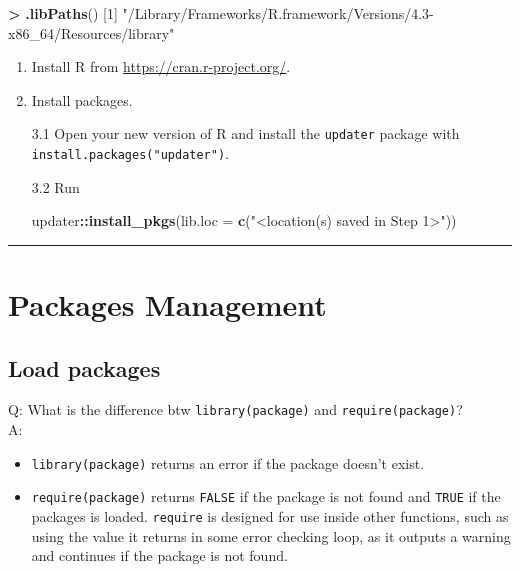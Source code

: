 \documentclass[
  a4paper,
  twoside,
  openright]{book}
\newenvironment{Shaded}{\begin{snugshade}}{\end{snugshade}}
\newcommand{\AttributeTok}[1]{\textcolor[rgb]{0.13,0.29,0.53}{#1}}
\newcommand{\DecValTok}[1]{\textcolor[rgb]{0.00,0.00,0.81}{#1}}
\newcommand{\FunctionTok}[1]{\textcolor[rgb]{0.13,0.29,0.53}{\textbf{#1}}}
\newcommand{\NormalTok}[1]{#1}
\newcommand{\SpecialCharTok}[1]{\textcolor[rgb]{0.81,0.36,0.00}{\textbf{#1}}}
\newcommand{\StringTok}[1]{\textcolor[rgb]{0.31,0.60,0.02}{#1}}
\theoremstyle{definition}
\theoremstyle{definition}
\theoremstyle{definition}
\theoremstyle{definition}
\theoremstyle{remark}
\begin{document}
\begin{Shaded}
\begin{Highlighting}[]
\SpecialCharTok{\textgreater{}} \FunctionTok{.libPaths}\NormalTok{()}
\NormalTok{[}\DecValTok{1}\NormalTok{] }\StringTok{"/Library/Frameworks/R.framework/Versions/4.3{-}x86\_64/Resources/library"}
\end{Highlighting}
\end{Shaded}

\begin{enumerate}
\def\labelenumi{\arabic{enumi}.}
\setcounter{enumi}{1}
\item
  Install R from \url{https://cran.r-project.org/}.
\item
  Install packages.

  3.1 Open your new version of R and install the \texttt{updater} package with \texttt{install.packages("updater")}.

  3.2 Run

\begin{Shaded}
\begin{Highlighting}[]
\NormalTok{updater}\SpecialCharTok{::}\FunctionTok{install\_pkgs}\NormalTok{(}\AttributeTok{lib.loc =} \FunctionTok{c}\NormalTok{(}\StringTok{"\textless{}location(s) saved in Step 1\textgreater{}"}\NormalTok{))}
\end{Highlighting}
\end{Shaded}
\end{enumerate}

\begin{center}\rule{0.5\linewidth}{0.5pt}\end{center}

\section{Packages Management}\label{packages-management}

\subsection{Load packages}\label{load-packages}

Q: What is the difference btw \texttt{library(package)} and \texttt{require(package)}?\\
A:

\begin{itemize}
\item
  \texttt{library(package)} returns an error if the package doesn't exist.
\item
  \texttt{require(package)} returns \texttt{FALSE} if the package is not found and \texttt{TRUE} if the packages is loaded. \texttt{require} is designed for use inside other functions, such as using the value it returns in some error checking loop, as it outputs a warning and continues if the package is not found.
\end{itemize}
\end{document}

